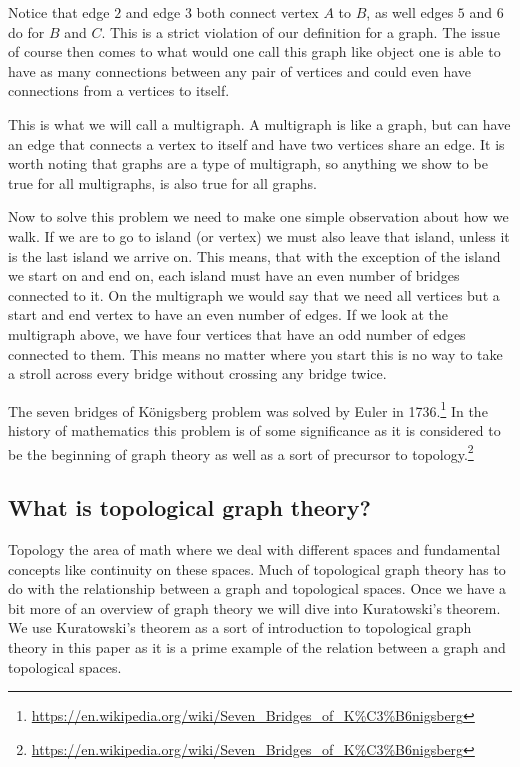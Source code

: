 \documentclass{article}
\begin{document}
Notice that edge $2$ and edge $3$ both connect vertex $A$ to $B$, as well edges $5$ and $6$ do for $B$ and $C$. This is a strict violation of our definition for a graph. The issue of course then comes to what would one call this graph like object one is able to have as many connections between any pair of vertices and could even have connections from a vertices to itself.

This is what we will call a multigraph. A multigraph is like a graph, but can have an edge that connects a vertex to itself and have two vertices share an edge. It is worth noting that graphs are a type of multigraph, so anything we show to be true for all multigraphs, is also true for all graphs.

Now to solve this problem we need to make one simple observation about how we walk. If we are to go to island (or vertex) we must also leave that island, unless it is the last island we arrive on. This means, that with the exception of the island we start on and end on, each island must have an even number of bridges connected to it. On the multigraph we would say that we need all vertices but a start and end vertex to have an even number of edges. If we look at the multigraph above, we have four vertices that have an odd number of edges connected to them. This means no matter where you start this is no way to take a stroll across every bridge without crossing any bridge twice.

The seven bridges of K\"onigsberg problem was solved by Euler in 1736.\footnote{\url{https://en.wikipedia.org/wiki/Seven_Bridges_of_K\%C3\%B6nigsberg}} In the history of mathematics this problem is of some significance as it is considered to be the beginning of graph theory as well as a sort of precursor to topology.\footnote{\url{https://en.wikipedia.org/wiki/Seven_Bridges_of_K\%C3\%B6nigsberg}}

\subsection{What is topological graph theory?}

Topology the area of math where we deal with different spaces and fundamental concepts like continuity on these spaces. Much of topological graph theory has to do with the relationship between a graph and topological spaces. Once we have a bit more of an overview of graph theory we will dive into Kuratowski's theorem. We use Kuratowski's theorem as a sort of introduction to topological graph theory in this paper as it is a prime example of the relation between a graph and topological spaces.
\end{document}
